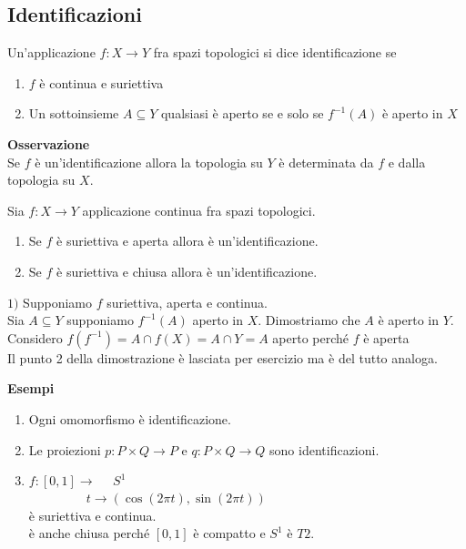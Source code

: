 \documentclass[12px]{article}
\begin{document}
 \subsection{Identificazioni}
 \begin{defi}
	 Un'applicazione $f: X \rightarrow Y$ fra spazi topologici si dice identificazione se
	 \begin{enumerate}
		 \item $f$ è continua e suriettiva
		 \item Un sottoinsieme $A\subseteq Y$ qualsiasi è aperto se e solo se  $f^{-1}(A)$ è aperto in $X$
	 \end{enumerate}
 \end{defi}
 \textbf{Osservazione}\\
Se $f $ è un'identificazione allora la topologia su $Y$ è determinata da $f$ e dalla topologia su $X.$\\
 \begin{lemm}
	Sia $f: X \rightarrow Y$ applicazione continua fra spazi topologici.
	\begin{enumerate}
		\item Se $f$ è suriettiva e aperta allora è un'identificazione.
		\item Se $f$ è suriettiva e chiusa allora è un'identificazione.
	\end{enumerate}
\end{lemm}
\begin{dimo}
	$1)$ Supponiamo  $f$ suriettiva, aperta e continua.\\
	Sia $A\subseteq Y$ supponiamo  $f^{-1}(A)$ aperto in $X$. Dimostriamo che $A$ è aperto in $Y$.\\
	Considero  $f(f^{-1}) = A\cap f(X) = A\cap Y = A$ aperto perché  $f$ è aperta\\
	Il punto 2 della dimostrazione è lasciata per esercizio ma è del tutto analoga.
\end{dimo}
\textbf{Esempi}\\
\begin{enumerate}
	\item Ogni omomorfismo è identificazione.
	\item Le proiezioni $p : P\times Q \rightarrow P$ e $q : P\times Q \rightarrow Q$ sono identificazioni.
	\item $f:[0,1] \rightarrow \ \ \ \ \ \ S^1$\\
		\text{}\ \ \ \ \ \ \ \ \ $t \rightarrow (\cos(2\pi t),\sin (2\pi t))$\\
		è suriettiva e continua.\\
		è anche chiusa perché $[0,1]$ è compatto e $S^1 $ è $T2$.
\end{enumerate}
\end{document}
